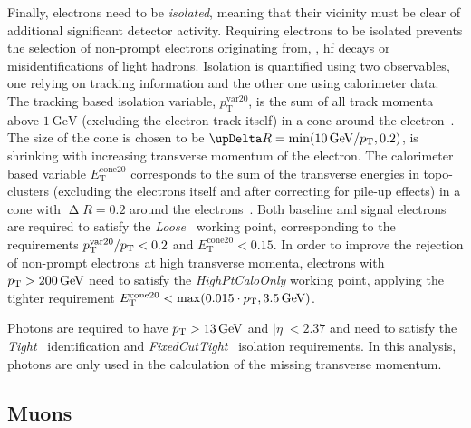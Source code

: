 Finally, electrons need to be \textit{isolated}, meaning that their vicinity must be clear of additional significant detector activity.
Requiring electrons to be isolated prevents the selection of non-prompt electrons originating from, \eg, \gls{hf} decays or misidentifications of light hadrons.
Isolation is quantified using two observables, one relying on tracking information and the other one using calorimeter data. The tracking based isolation variable, $p_{\mathrm{T}}^{\mathrm{var20}}$, is the sum of all track momenta above $\SI{1}{\GeV}$ (excluding the electron track itself) in a cone around the electron~\cite{EGAM-2018-01}.
The size of the cone is chosen to be $\upDelta R = \min (\SI{10}{\GeV}/\pt,0.2)$, \ie is shrinking with increasing transverse momentum of the electron.
The calorimeter based variable $E_{\mathrm{T}}^{\mathrm{cone20}}$ corresponds to the sum of the transverse energies in topo-clusters (excluding the electrons itself and after correcting for pile-up effects) in a cone with $\upDelta R = 0.2$ around the electrons~\cite{EGAM-2018-01}.
Both baseline and signal electrons are required to satisfy the \textit{Loose}~\cite{EGAM-2018-01} working point, corresponding to the requirements $p_{\mathrm{T}}^{\mathrm{var20}}/p_{\mathrm{T}} < 0.2$ and $E_{\mathrm{T}}^{\mathrm{cone20}} < 0.15$.
In order to improve the rejection of non-prompt electrons at high transverse momenta, electrons with $\pt >\SI{200}{\GeV}$ need to satisfy the \textit{HighPtCaloOnly} working point, applying the tighter requirement $E_{\mathrm{T}}^{\mathrm{cone20}} < \max (0.015\cdot\pt,\SI{3.5}{\GeV})$. 

Photons are required to have $p_{\mathrm{T}} > \SI{13}{GeV}$ and $\vert\eta\vert<2.37$ and need to satisfy the \textit{Tight}~\cite{EGAM-2018-01} identification and \textit{FixedCutTight}~\cite{EGAM-2018-01} isolation requirements.
In this analysis, photons are only used in the calculation of the missing transverse momentum.

\subsection{Muons}\label{sec:reco_muon}

